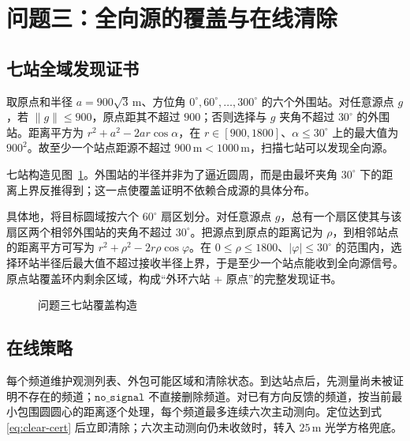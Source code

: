 \section{问题三：全向源的覆盖与在线清除}
\subsection{七站全域发现证书}
取原点和半径 $a=900\sqrt3\,\mathrm m$、方位角 $0^\circ,60^\circ,\ldots,300^\circ$ 的六个外围站。对任意源点 $g$，若 $\|g\|\le900$，原点距其不超过 $900$；否则选择与 $g$ 夹角不超过 $30^\circ$ 的外围站。距离平方为 $r^2+a^2-2ar\cos\alpha$，在 $r\in[900,1800]$、$\alpha\le30^\circ$ 上的最大值为 $900^2$。故至少一个站点距源不超过 $900\,\mathrm m<1000\,\mathrm m$，扫描七站可以发现全向源。

七站构造见图~\ref{fig:q3-stations}。外围站的半径并非为了逼近圆周，而是由最坏夹角 $30^\circ$ 下的距离上界反推得到；这一点使覆盖证明不依赖合成源的具体分布。

具体地，将目标圆域按六个 $60^\circ$ 扇区划分。对任意源点 $g$，总有一个扇区使其与该扇区两个相邻外围站的夹角不超过 $30^\circ$。把源点到原点的距离记为 $\rho$，到相邻站点的距离平方可写为 $r^2+\rho^2-2r\rho\cos\varphi$。在 $0\le\rho\le1800$、$|\varphi|\le30^\circ$ 的范围内，选择环站半径后最大值不超过接收半径上界，于是至少一个站点能收到全向源信号。原点站覆盖环内剩余区域，构成“外环六站 + 原点”的完整发现证书。

\begin{figure}[H]\centering
{}
\caption{问题三七站覆盖构造}\label{fig:q3-stations}
\end{figure}

\subsection{在线策略}
每个频道维护观测列表、外包可能区域和清除状态。到达站点后，先测量尚未被证明不存在的频道；$\texttt{no\_signal}$ 不直接删除频道。对已有方向反馈的频道，按当前最小包围圆圆心的距离逐个处理，每个频道最多连续六次主动测向。定位达到式 \eqref{eq:clear-cert} 后立即清除；六次主动测向仍未收敛时，转入 $25\,\mathrm m$ 光学方格兜底。

